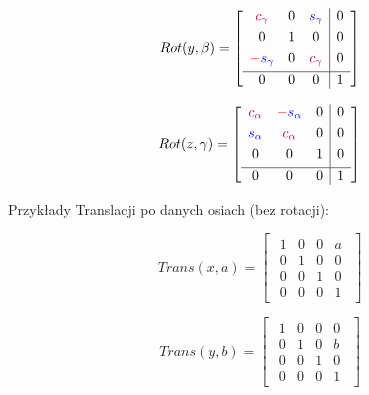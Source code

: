 \documentclass{article}
\begin{document}
\Large
$$
    Rot(y, \beta) =
    \begin{bmatrix}
        \begin{array}{ccc|c}
            {\color{purple} c_{\gamma}}             & 0 & {\color{blue} s_{\gamma}}   & 0 \\[0.3em]
            0                                       & 1 & 0                           & 0 \\[0.3em]
            {\color{red}-}{\color{blue} s_{\gamma}} & 0 & {\color{purple} c_{\gamma}} & 0 \\[0.3em]
            \hline
            0                                       & 0 & 0                           & 1
        \end{array}
    \end{bmatrix}
$$
\normalsize



\Large
$$
    Rot(z, \gamma) =
    \begin{bmatrix}
        \begin{array}{ccc|c}
            {\color{purple} c_{\alpha}} & {\color{red}-}{\color{blue} s_{\alpha}} & 0 & 0 \\[0.3em]
            {\color{blue} s_{\alpha}}   & {\color{purple} c_{\alpha}}             & 0 & 0 \\[0.3em]
            0                           & 0                                       & 1 & 0 \\[0.3em]
            \hline
            0                           & 0                                       & 0 & 1
        \end{array}
    \end{bmatrix}
$$
\normalsize


\newpage

Przykłady Translacji po danych osiach (bez rotacji):


\Large
$$
    Trans(x, a) =
    \begin{bmatrix}
        \begin{array}{ccc|c}
            1 & 0 & 0 & a \\[0.3em]
            0 & 1 & 0 & 0 \\[0.3em]
            0 & 0 & 1 & 0 \\[0.3em]
            \hline
            0 & 0 & 0 & 1
        \end{array}
    \end{bmatrix}
$$
\normalsize


\Large
$$
    Trans(y, b) =
    \begin{bmatrix}
        \begin{array}{ccc|c}
            1 & 0 & 0 & 0 \\[0.3em]
            0 & 1 & 0 & b \\[0.3em]
            0 & 0 & 1 & 0 \\[0.3em]
            \hline
            0 & 0 & 0 & 1
        \end{array}
    \end{bmatrix}
$$
\normalsize
\end{document}
